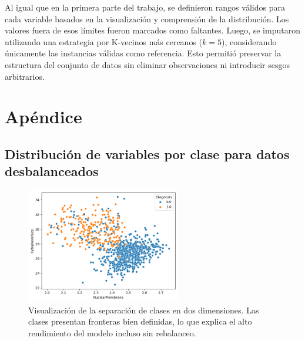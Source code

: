 \documentclass[11pt]{article}
\begin{document}
Al igual que en la primera parte del trabajo, se definieron rangos válidos para cada variable basados en la visualización y comprensión de la distribución. Los valores fuera de esos límites fueron marcados como faltantes. Luego, se imputaron utilizando una estrategia por K-vecinos más cercanos ($k=5$), considerando únicamente las instancias válidas como referencia. Esto permitió preservar la estructura del conjunto de datos sin eliminar observaciones ni introducir sesgos arbitrarios.










\appendix
\section{Apéndice}
\subsection{Distribución de variables por clase para datos desbalanceados}

\begin{figure}[H]
    \centering
    \includegraphics[width=0.6\textwidth]{figures/separability_scatter.png}
    \caption{Visualización de la separación de clases en dos dimensiones. Las clases presentan fronteras bien definidas, lo que explica el alto rendimiento del modelo incluso sin rebalanceo.}
    \label{fig:scatter_appendix}
\end{figure}
\end{document}
